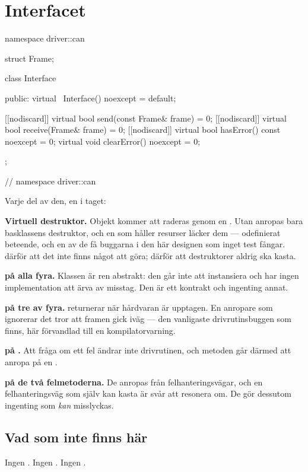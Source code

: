 \section{Interfacet}
\label{sec:interface}

\begin{cppcode}
namespace driver::can
{
struct Frame;

class Interface
{
public:
    virtual ~Interface() noexcept = default;

    [[nodiscard]] virtual bool send(const Frame& frame)      = 0;
    [[nodiscard]] virtual bool receive(Frame& frame)         = 0;
    [[nodiscard]] virtual bool hasError() const noexcept     = 0;
    virtual void clearError() noexcept                       = 0;
};
} // namespace driver::can
\end{cppcode}

Varje del av den, en i taget:

\textbf{Virtuell destruktor.} Objekt kommer att raderas genom en . Utan
 anropas bara basklassens destruktor, och en  som håller resurser läcker
dem --- odefinierat beteende, och en av de få buggarna i den här designen som inget test fångar.
 därför att det inte finns något att göra;  därför att destruktorer
aldrig ska kasta.

\textbf{ på alla fyra.} Klassen är ren abstrakt: den går inte att instansiera och har
ingen implementation att ärva av misstag. Den är ett kontrakt och ingenting annat.

\textbf{\code{[[nodiscard]]} på tre av fyra.}  returnerar  när hårdvaran
är upptagen. En anropare som ignorerar det tror att framen gick iväg --- den vanligaste
drivrutinsbuggen som finns, här förvandlad till en kompilatorvarning.

\textbf{ på .} Att fråga om ett fel ändrar inte drivrutinen, och
metoden går därmed att anropa på en .

\textbf{ på de två felmetoderna.} De anropas från felhanteringsvägar, och en
felhanteringsväg som själv kan kasta är svår att resonera om. De gör dessutom ingenting som
\emph{kan} misslyckas.

\subsection{Vad som inte finns här}

Ingen . Ingen . Ingen .

